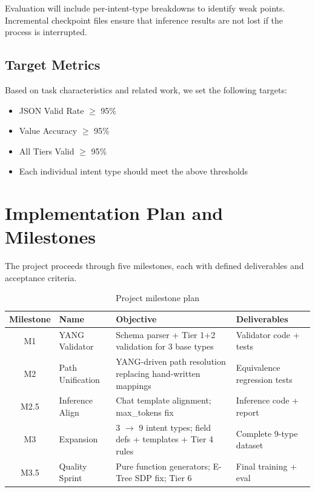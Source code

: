 \documentclass[12pt, a4paper]{article}
\begin{document}
\noindent
Evaluation will include per-intent-type breakdowns to identify weak points. Incremental checkpoint files ensure that inference results are not lost if the process is interrupted.

\subsection{Target Metrics}

Based on task characteristics and related work, we set the following targets:

\begin{itemize}
  \item JSON Valid Rate $\geq$ 95\%
  \item Value Accuracy $\geq$ 95\%
  \item All Tiers Valid $\geq$ 95\%
  \item Each individual intent type should meet the above thresholds
\end{itemize}

\section{Implementation Plan and Milestones}
\label{sec:milestones}

The project proceeds through five milestones, each with defined deliverables and acceptance criteria.

\begin{table}[H]
\centering
\caption{Project milestone plan}
\label{tab:milestones}
\small
\begin{tabular}{clp{5.5cm}p{3.5cm}}
\toprule
\textbf{Milestone} & \textbf{Name} & \textbf{Objective} & \textbf{Deliverables} \\
\midrule
M1 & YANG Validator &
  Schema parser + Tier 1+2 validation for 3 base types &
  Validator code + tests \\
\addlinespace
M2 & Path Unification &
  YANG-driven path resolution replacing hand-written mappings &
  Equivalence regression tests \\
\addlinespace
M2.5 & Inference Align &
  Chat template alignment; max\_tokens fix &
  Inference code + report \\
\addlinespace
M3 & Expansion &
  3 $\to$ 9 intent types; field defs + templates + Tier 4 rules &
  Complete 9-type dataset \\
\addlinespace
M3.5 & Quality Sprint &
  Pure function generators; E-Tree SDP fix; Tier 6 &
  Final training + eval \\
\bottomrule
\end{tabular}
\end{table}
\end{document}
